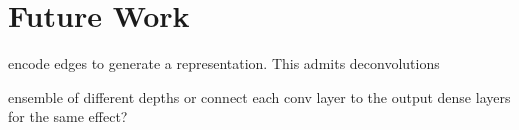 \chapter{Future Work}
\label{chap:future}

encode edges to generate a representation. This admits deconvolutions

ensemble of different depths or connect each conv layer to the output dense layers for the same effect?